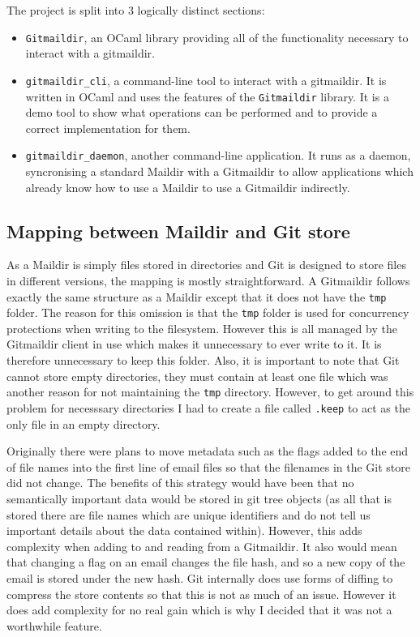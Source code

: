 The project is split into 3 logically distinct sections:
\begin{itemize}
  \item \texttt{Gitmaildir}, an OCaml library providing all of the functionality necessary to interact with a gitmaildir.
  \item \texttt{gitmaildir\_cli}, a command-line tool to interact with a gitmaildir. It is written in OCaml and uses the features of the \texttt{Gitmaildir} library. It is a demo tool to show what operations can be performed and to provide a correct implementation for them.
  \item \texttt{gitmaildir\_daemon}, another command-line application. It runs as a daemon, syncronising a standard Maildir with a Gitmaildir to allow applications which already know how to use a Maildir to use a Gitmaildir indirectly.
\end{itemize}

\subsection{Mapping between Maildir and Git store} \label{section:mapping}

As a Maildir is simply files stored in directories and Git is designed to store files in different versions, the mapping is mostly straightforward. A Gitmaildir follows exactly the same structure as a Maildir except that it does not have the \texttt{tmp} folder. The reason for this omission is that the \texttt{tmp} folder is used for concurrency protections when writing to the filesystem. However this is all managed by the Gitmaildir client in use which makes it unnecessary to ever write to it. It is therefore unnecessary to keep this folder. Also, it is important to note that Git cannot store empty directories, they must contain at least one file which was another reason for not maintaining the \texttt{tmp} directory. However, to get around this problem for necesssary directories I had to create a file called \texttt{.keep} to act as the only file in an empty directory.

Originally there were plans to move metadata such as the flags added to the end of file names into the first line of email files so that the filenames in the Git store did not change. The benefits of this strategy would have been that no semantically important data would be stored in git tree objects (as all that is stored there are file names which are unique identifiers and do not tell us important details about the data contained within). However, this adds complexity when adding to and reading from a Gitmaildir. It also would mean that changing a flag on an email changes the file hash, and so a new copy of the email is stored under the new hash. Git internally does use forms of diffing to compress the store contents so that this is not as much of an issue. However it does add complexity for no real gain which is why I decided that it was not a worthwhile feature.

